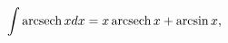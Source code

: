 \[\int\mathop{\mathrm{arcsech}\/}\nolimits xdx=x\mathop{\mathrm{arcsech}\/}%
\nolimits x+\mathop{\mathrm{arcsin}\/}\nolimits x,\]